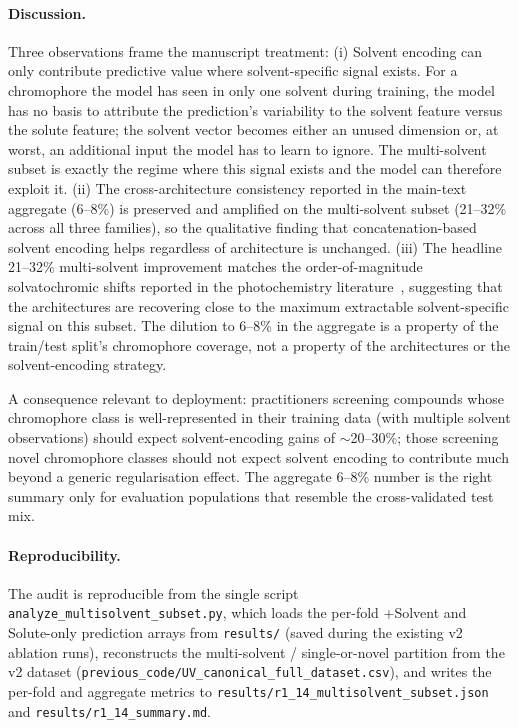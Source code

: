 \documentclass[journal=jcisd8,manuscript=suppinfo]{achemso}
\begin{document}
\paragraph{Discussion.}
Three observations frame the manuscript treatment:
(i) Solvent encoding can only contribute predictive value where solvent-specific signal exists. For a chromophore the model has seen in only one solvent during training, the model has no basis to attribute the prediction's variability to the solvent feature versus the solute feature; the solvent vector becomes either an unused dimension or, at worst, an additional input the model has to learn to ignore. The multi-solvent subset is exactly the regime where this signal exists and the model can therefore exploit it.
(ii) The cross-architecture consistency reported in the main-text aggregate (6--8\%) is preserved and amplified on the multi-solvent subset (21--32\% across all three families), so the qualitative finding that concatenation-based solvent encoding helps regardless of architecture is unchanged.
(iii) The headline 21--32\% multi-solvent improvement matches the order-of-magnitude solvatochromic shifts reported in the photochemistry literature~\cite{reichardt2011solvents}, suggesting that the architectures are recovering close to the maximum extractable solvent-specific signal on this subset. The dilution to 6--8\% in the aggregate is a property of the train/test split's chromophore coverage, not a property of the architectures or the solvent-encoding strategy.

A consequence relevant to deployment: practitioners screening compounds whose chromophore class is well-represented in their training data (with multiple solvent observations) should expect solvent-encoding gains of $\sim$20--30\%; those screening novel chromophore classes should not expect solvent encoding to contribute much beyond a generic regularisation effect. The aggregate 6--8\% number is the right summary only for evaluation populations that resemble the cross-validated test mix.

\paragraph{Reproducibility.} The audit is reproducible from the single script \texttt{analyze\_multisolvent\_subset.py}, which loads the per-fold +Solvent and Solute-only prediction arrays from \texttt{results/} (saved during the existing v2 ablation runs), reconstructs the multi-solvent / single-or-novel partition from the v2 dataset (\texttt{previous\_code/UV\_canonical\_full\_dataset.csv}), and writes the per-fold and aggregate metrics to \texttt{results/r1\_14\_multisolvent\_subset.json} and \texttt{results/r1\_14\_summary.md}.
\end{document}
